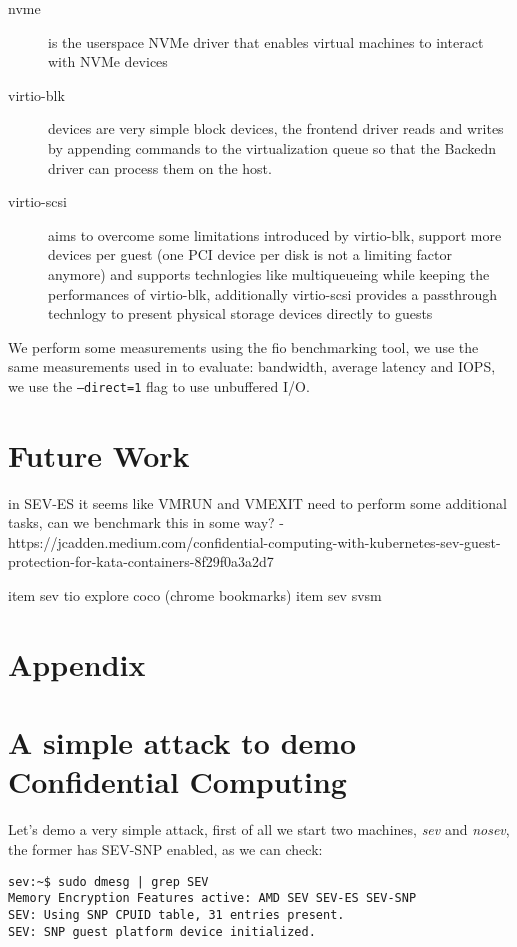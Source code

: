 \documentclass[twocolumn]{article}
\begin{document}
\begin{description}
    \item[nvme] is the userspace NVMe driver that enables virtual machines to interact with NVMe devices
    \item[virtio-blk] devices are very simple block devices, the frontend driver reads and writes by appending commands to the virtualization queue so that the Backedn driver can process them on the host.
    \item[virtio-scsi] aims to overcome some limitations introduced by virtio-blk, support more devices per guest (one PCI device per disk is not a limiting factor anymore) and supports technlogies like multiqueueing while keeping the performances of virtio-blk, additionally virtio-scsi provides a passthrough technlogy to present physical storage devices directly to guests
\end{description}

We perform some measurements using the fio \cite{fio} benchmarking tool, we use the same measurements used in \cite{spool} to evaluate: bandwidth, average latency and IOPS, we use the \texttt{--direct=1} flag to use unbuffered I/O.


\section{Future Work}
in SEV-ES it seems like VMRUN and VMEXIT need to perform some additional tasks, can we benchmark this in some way?
- https://jcadden.medium.com/confidential-computing-with-kubernetes-sev-guest-protection-for-kata-containers-8f29f0a3a2d7

item sev tio 
explore coco (chrome bookmarks)
item sev svsm

\printbibliography
\appendix
\section*{Appendix}
\section{A simple attack to demo Confidential Computing}
Let's demo a very simple attack, first of all we start two machines, \textit{sev} and \textit{nosev}, the former has SEV-SNP enabled, as we can check:

\begin{verbatim}
sev:~$ sudo dmesg | grep SEV
Memory Encryption Features active: AMD SEV SEV-ES SEV-SNP
SEV: Using SNP CPUID table, 31 entries present.
SEV: SNP guest platform device initialized.
\end{verbatim}
\end{document}
